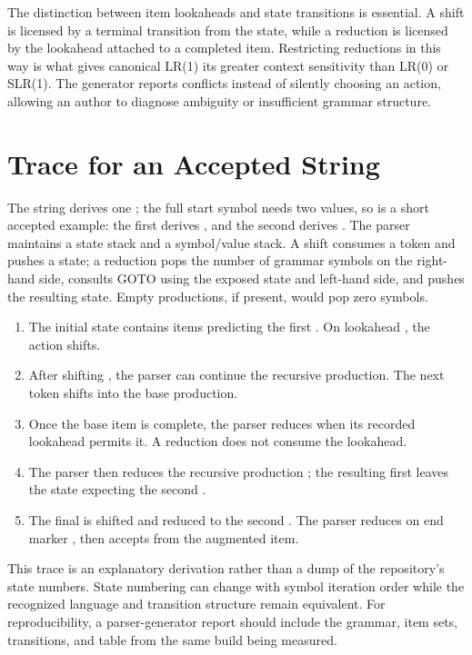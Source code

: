 \documentclass[12pt,a4paper,oneside]{report}
\newcommand{\code}[1]{\texttt{\detokenize{#1}}}
\begin{document}
The distinction between item lookaheads and state transitions is essential. A shift is licensed by a terminal transition from the state, while a reduction is licensed by the lookahead attached to a completed item. Restricting reductions in this way is what gives canonical LR(1) its greater context sensitivity than LR(0) or SLR(1). The generator reports conflicts instead of silently choosing an action, allowing an author to diagnose ambiguity or insufficient grammar structure.

\section{Trace for an Accepted String}
The string \code{cd} derives one \code{C}; the full start symbol needs two \code{C} values, so \code{cdd} is a short accepted example: the first \code{C} derives \code{cd}, and the second derives \code{d}. The parser maintains a state stack and a symbol/value stack. A shift consumes a token and pushes a state; a reduction pops the number of grammar symbols on the right-hand side, consults GOTO using the exposed state and left-hand side, and pushes the resulting state. Empty productions, if present, would pop zero symbols.

\begin{enumerate}
\item The initial state contains items predicting the first \code{C}. On lookahead \code{c}, the action shifts.
\item After shifting \code{c}, the parser can continue the recursive \code{C -> c C} production. The next token \code{d} shifts into the base production.
\item Once the base item is complete, the parser reduces \code{C -> d} when its recorded lookahead permits it. A reduction does not consume the lookahead.
\item The parser then reduces the recursive production \code{C -> c C}; the resulting first \code{C} leaves the state expecting the second \code{C}.
\item The final \code{d} is shifted and reduced to the second \code{C}. The parser reduces \code{S -> C C} on end marker \code{$}, then accepts from the augmented item.
\end{enumerate}

This trace is an explanatory derivation rather than a dump of the repository's state numbers. State numbering can change with symbol iteration order while the recognized language and transition structure remain equivalent. For reproducibility, a parser-generator report should include the grammar, item sets, transitions, and table from the same build being measured.
\end{document}
